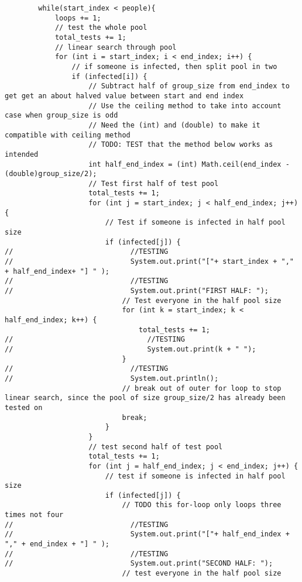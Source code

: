 \documentclass{article}
\begin{document}
\begin{lstlisting}
        while(start_index < people){
            loops += 1;
            // test the whole pool
            total_tests += 1;
            // linear search through pool
            for (int i = start_index; i < end_index; i++) {
                // if someone is infected, then split pool in two
                if (infected[i]) {
                    // Subtract half of group_size from end_index to get get an about halved value between start and end index
                    // Use the ceiling method to take into account case when group_size is odd
                    // Need the (int) and (double) to make it compatible with ceiling method
                    // TODO: TEST that the method below works as intended
                    int half_end_index = (int) Math.ceil(end_index - (double)group_size/2);
                    // Test first half of test pool
                    total_tests += 1;
                    for (int j = start_index; j < half_end_index; j++) {
                        // Test if someone is infected in half pool size
                        if (infected[j]) {
//                            //TESTING
//                            System.out.print("["+ start_index + "," + half_end_index+ "] " );
//                            //TESTING
//                            System.out.print("FIRST HALF: ");
                            // Test everyone in the half pool size
                            for (int k = start_index; k < half_end_index; k++) {
                                total_tests += 1;
//                                //TESTING
//                                System.out.print(k + " ");
                            }
//                            //TESTING
//                            System.out.println();
                            // break out of outer for loop to stop linear search, since the pool of size group_size/2 has already been tested on
                            break;
                        }
                    }
                    // test second half of test pool
                    total_tests += 1;
                    for (int j = half_end_index; j < end_index; j++) {
                        // test if someone is infected in half pool size
                        if (infected[j]) {
                            // TODO this for-loop only loops three times not four
//                            //TESTING
//                            System.out.print("["+ half_end_index + "," + end_index + "] " );
//                            //TESTING
//                            System.out.print("SECOND HALF: ");
                            // test everyone in the half pool size

\end{lstlisting}
\end{document}
